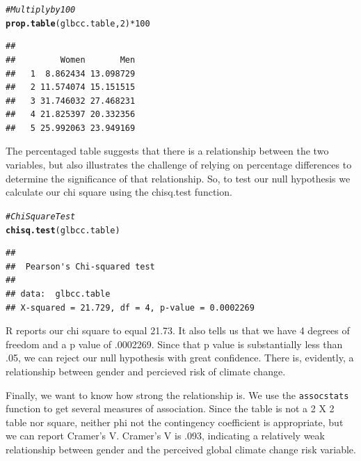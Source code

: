 \documentclass[11pt,openany]{book}\usepackage[]{graphicx}\usepackage[]{color}
\makeatletter
\newcommand{\hlnum}[1]{\textcolor[rgb]{0.686,0.059,0.569}{#1}}%
\newcommand{\hlcom}[1]{\textcolor[rgb]{0.678,0.584,0.686}{\textit{#1}}}%
\newcommand{\hlopt}[1]{\textcolor[rgb]{0,0,0}{#1}}%
\newcommand{\hlstd}[1]{\textcolor[rgb]{0.345,0.345,0.345}{#1}}%
\newcommand{\hlkwd}[1]{\textcolor[rgb]{0.737,0.353,0.396}{\textbf{#1}}}%
\newenvironment{kframe}{%
 \def\at@end@of@kframe{}%
 \ifinner\ifhmode%
  \def\at@end@of@kframe{\end{minipage}}%
  \begin{minipage}{\columnwidth}%
 \fi\fi%
 \def\FrameCommand##1{\hskip\@totalleftmargin \hskip-\fboxsep
 \colorbox{shadecolor}{##1}\hskip-\fboxsep
     \hskip-\linewidth \hskip-\@totalleftmargin \hskip\columnwidth}%
 \MakeFramed {\advance\hsize-\width
   \@totalleftmargin\z@ \linewidth\hsize
   \@setminipage}}%
 {\par\unskip\endMakeFramed%
 \at@end@of@kframe}
\newenvironment{knitrout}{}{} %
\renewenvironment{knitrout}{\begin{singlespace}}{\end{singlespace}}
\makeatother
\begin{document}
\begin{knitrout}
\color{fgcolor}\begin{kframe}
\begin{alltt}
\hlcom{# Multiply by 100}
\hlkwd{prop.table}\hlstd{(glbcc.table,} \hlnum{2}\hlstd{)} \hlopt{*} \hlnum{100}
\end{alltt}
\begin{verbatim}
##    
##         Women       Men
##   1  8.862434 13.098729
##   2 11.574074 15.151515
##   3 31.746032 27.468231
##   4 21.825397 20.332356
##   5 25.992063 23.949169
\end{verbatim}
\end{kframe}
\end{knitrout}
  
The percentaged table suggests that there is a relationship between the two variables, but also illustrates the challenge of relying on percentage differences to determine the significance of that relationship.  So, to test our null hypothesis we calculate our chi square using the chisq.test function.  

\begin{knitrout}
\color{fgcolor}\begin{kframe}
\begin{alltt}
\hlcom{# Chi Square Test}
\hlkwd{chisq.test}\hlstd{(glbcc.table)}
\end{alltt}
\begin{verbatim}
## 
## 	Pearson's Chi-squared test
## 
## data:  glbcc.table
## X-squared = 21.729, df = 4, p-value = 0.0002269
\end{verbatim}
\end{kframe}
\end{knitrout}

R reports our chi square to equal 21.73.  It also tells us that we have 4 degrees of freedom and a p value of .0002269.  Since that p value is substantially less than .05, we can reject our null hypothesis with great confidence.  There is, evidently, a relationship between gender and percieved risk of climate change.

Finally, we want to know how strong the relationship is.  We use the \texttt{assocstats} function to get several measures of association.   Since the table is not a 2 X 2 table nor square, neither phi not the contingency coefficient is appropriate, but we can report Cramer's V.  Cramer's V is .093, indicating a relatively weak relationship between gender and the perceived global climate change risk variable.
\end{document}
